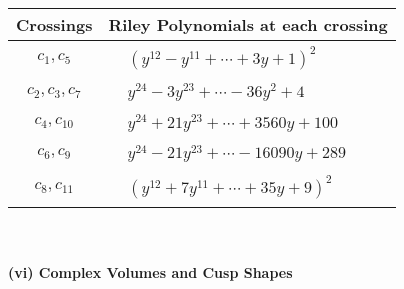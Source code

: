 \documentclass[1p]{elsarticle_modified}
\theoremstyle{definition}
\begin{document}
\begin{tabular}{m{50pt}|m{274pt}}
Crossings & \hspace{64pt}Riley Polynomials at each crossing \\
\hline $$\begin{aligned}c_{1},c_{5}\end{aligned}$$&$\begin{aligned}
&(y^{12}- y^{11}+\cdots+3 y+1)^{2}
\end{aligned}$\\
\hline $$\begin{aligned}c_{2},c_{3},c_{7}\end{aligned}$$&$\begin{aligned}
&y^{24}-3 y^{23}+\cdots-36 y^2+4
\end{aligned}$\\
\hline $$\begin{aligned}c_{4},c_{10}\end{aligned}$$&$\begin{aligned}
&y^{24}+21 y^{23}+\cdots+3560 y+100
\end{aligned}$\\
\hline $$\begin{aligned}c_{6},c_{9}\end{aligned}$$&$\begin{aligned}
&y^{24}-21 y^{23}+\cdots-16090 y+289
\end{aligned}$\\
\hline $$\begin{aligned}c_{8},c_{11}\end{aligned}$$&$\begin{aligned}
&(y^{12}+7 y^{11}+\cdots+35 y+9)^{2}
\end{aligned}$\\
\hline
\end{tabular}\\~\\
\newpage\flushleft \textbf{(vi) Complex Volumes and Cusp Shapes}
\end{document}

